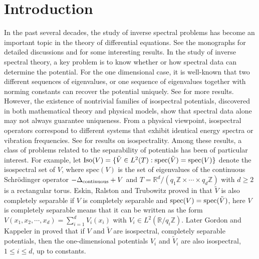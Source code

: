 \documentclass[12pt,letterpaper]{amsart}
\def\R{{\mathbb R}}
\def\Z{{\mathbb Z}}
\begin{document}
\section{Introduction}
In the past several decades, the study of inverse spectral problems has become an important topic in the theory of differential equations.
See the monographs \cite{pt, yu} for detailed discussions and \cite{dt, eck-1, eck-2,e, g, gu, imt, it, mt, tru, wu} for some interesting results. In the study of inverse spectral theory, a key problem is to know whether or how spectral data can determine the potential. For the one dimensional case, it is well-known that two different sequences of eigenvalues, or one sequence of eigenvalues together with {norming constants} can recover the potential uniquely. See \cite{hm, marchen, ml,rs,yu} for more results. However, the existence of nontrivial families of isospectral potentials, discovered in both mathematical theory and physical models, show that spectral data alone may not always guarantee uniqueness. {From a physical viewpoint, isospectral operators correspond to different systems that exhibit identical energy spectra or vibration frequencies. See \cite{ert-1,ert-2,flmp,gk-1,gk-2,k-1,k-2,k-3,liucmp, w} for results on isospectrality. Among these results, a class of problems related to the separability of potentials has been of particular interest.}
For example,
let ${\rm Iso}(V)=\{\tilde{V}\in L^2(T):{\rm spec}(\tilde{V})={\rm spec}({V})\}$ denote the isospectral set of $V$, where spec$(V)$ is the set of eigenvalues of the continuous Schr\"{o}dinger operator $-\Delta_{\rm continuous}+V$ and $T=\R^d/(q_1\Z\times\cdots\times q_d\Z)$ with $d\geq 2$ is a rectangular torus. Eskin, Ralston and Trubowitz proved in \cite{ert-1, ert-2} that $\tilde{V}$ is also completely separable if $V$ is completely separable and ${\rm spec}(V)={\rm spec}(\tilde{V})$,
here $V$ is completely separable means that it can be written as the form $V(x_1,x_2,\cdots,x_d)=\sum_{i=1}^dV_i(x_i)$ with $V_i\in L^2(\R/q_i\Z)$.
Later  Gordon and Kappeler in \cite{gk-1} proved that if $V$ and $\tilde{V}$ are isospectral, completely separable potentials, then the one-dimensional potentials $V_i$ and $\tilde{V}_i$ are also isospectral, $1\leq i\leq d$, up to constants. 
\end{document}
